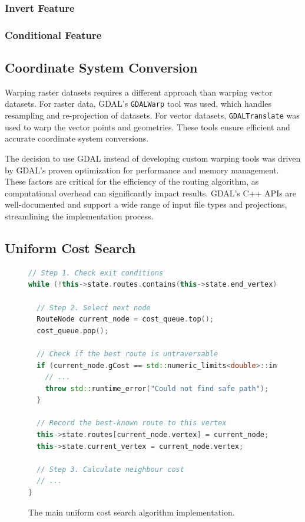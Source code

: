 \documentclass[12pt]{article}
\begin{document}
\subsubsection{Invert Feature}

\subsubsection{Conditional Feature}

\subsection{Coordinate System Conversion}

Warping raster datasets requires a different approach than warping vector datasets. For raster data, GDAL's \texttt{GDALWarp} tool was used, which handles resampling and re-projection of datasets. For vector datasets, \texttt{GDALTranslate} was used to warp the vector points and geometries. These tools ensure efficient and accurate coordinate system conversions.

The decision to use GDAL instead of developing custom warping tools was driven by GDAL's proven optimization for performance and memory management. These factors are critical for the efficiency of the routing algorithm, as computational overhead can significantly impact results. GDAL's C++ APIs are well-documented and support a wide range of input file types and projections, streamlining the implementation process.

\subsection{Uniform Cost Search}

\begin{figure}[H]
  \centering
  \begin{lstlisting}[language=c++]
// Step 1. Check exit conditions
while (!this->state.routes.contains(this->state.end_vertex)) {

  // Step 2. Select next node
  RouteNode current_node = cost_queue.top();
  cost_queue.pop();
  
  // Check if the best route is untraversable
  if (current_node.gCost == std::numeric_limits<double>::infinity()) {
    // ...
    throw std::runtime_error("Could not find safe path");
  }

  // Record the best-known route to this vertex
  this->state.routes[current_node.vertex] = current_node;
  this->state.current_vertex = current_node.vertex;

  // Step 3. Calculate neighbour cost
  // ...
}
\end{lstlisting}
  \caption{The main uniform cost search algorithm implementation.}
  \label{fig:impl:search:mainloop}
\end{figure}
\end{document}
